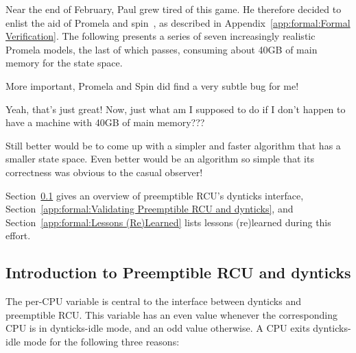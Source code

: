 Near the end of February, Paul grew tired of this game.
He therefore decided to enlist the aid of
Promela and spin~\cite{Holzmann03a}, as described in
Appendix~\ref{app:formal:Formal Verification}.
The following presents a series of seven increasingly realistic
Promela models, the last of which passes, consuming about
40GB of main memory for the state space.

More important, Promela and Spin did find a very subtle bug for me!

\QuickQuiz{}
	Yeah, that's just great!
	Now, just what am I supposed to do if I don't happen to have a
	machine with 40GB of main memory???
 \QuickQuizEnd

Still better would be to come up with a simpler and faster algorithm
that has a smaller state space.
Even better would be an algorithm so simple that its correctness was
obvious to the casual observer!

Section~\ref{app:formal:Introduction to Preemptible RCU and dynticks}
gives an overview of preemptible RCU's dynticks interface,
Section~\ref{app:formal:Validating Preemptible RCU and dynticks},
and
Section~\ref{app:formal:Lessons (Re)Learned} lists
lessons (re)learned during this effort.

\subsection{Introduction to Preemptible RCU and dynticks}
\label{app:formal:Introduction to Preemptible RCU and dynticks}

The per-CPU  variable is
central to the interface between dynticks and preemptible RCU.
This variable has an even value whenever the corresponding CPU
is in dynticks-idle mode, and an odd value otherwise.
A CPU exits dynticks-idle mode for the following three reasons:

